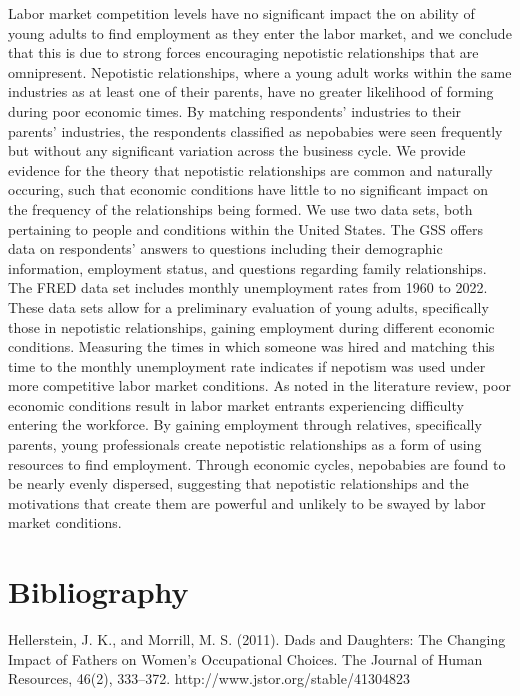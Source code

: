 \documentclass[12pt]{article}
\begin{document}
Labor market competition levels have no significant impact the on ability of young adults to find employment as they enter the labor market, and we conclude that this is due to strong forces encouraging nepotistic relationships that are omnipresent. Nepotistic relationships, where a young adult works within the same industries as at least one of their parents, have no greater likelihood of forming during poor economic times. By matching respondents’ industries to their parents’ industries, the respondents classified as nepobabies were seen frequently but without any significant variation across the business cycle. We provide evidence for the theory that nepotistic relationships are common and naturally occuring, such that economic conditions have little to no significant impact on the frequency of the relationships being formed. 
We use two data sets, both pertaining to people and conditions within the United States. The GSS offers data on respondents' answers to questions including their demographic information, employment status, and questions regarding family relationships. The FRED data set includes monthly unemployment rates from 1960 to 2022. These data sets allow for a preliminary evaluation of young adults, specifically those in nepotistic relationships, gaining employment during different economic conditions.
Measuring the times in which someone was hired and matching this time to the monthly unemployment rate indicates if nepotism was used under more competitive labor market conditions. As noted in the literature review, poor economic conditions result in labor market entrants experiencing difficulty entering the workforce. By gaining employment through relatives, specifically parents, young professionals create nepotistic relationships as a form of using resources to find employment. Through economic cycles, nepobabies are found to be nearly evenly dispersed, suggesting that nepotistic relationships and the motivations that create them are powerful and unlikely to be swayed by labor market conditions. 


\newpage
\section*{Bibliography}
\singlespacing
\setlength\bibsep{1pt}

\hspace{1cm}Hellerstein, J. K., and Morrill, M. S. (2011). Dads and Daughters: The Changing Impact of Fathers on Women’s Occupational Choices. The Journal of Human Resources, 46(2), 333–372. http://www.jstor.org/stable/41304823
\end{document}
